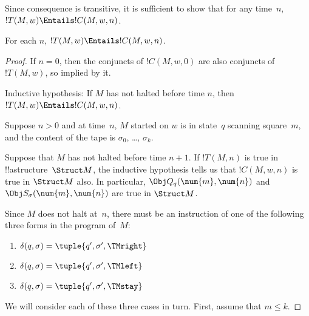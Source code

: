 \documentclass[../../../include/open-logic-section]{subfiles}
\begin{document}
Since consequence is transitive, it is sufficient to show that for any
time~$n$, $!T(M, w) \Entails !C(M, w, n)$.

\begin{lem} 
For each $n$, $!T(M, w) \Entails !C(M, w, n)$. 
\end{lem}

\begin{proof}
If $n = 0$, then the conjuncts of $!C(M, w, 0)$ are also conjuncts of
$!T(M, w)$, so implied by it.

Inductive hypothesis: If $M$ has not halted before time $n$, then
$!T(M,w) \Entails !C(M, w, n)$.

Suppose $n > 0$ and at time~$n$, $M$ started on $w$ is in state~$q$
scanning square~$m$, and the content of the tape is $\sigma_0$, \dots,
$\sigma_k$.

Suppose that $M$ has not halted before time $n+1$. If $!T(M,n)$ is
true in !!a{structure}~$\Struct M$, the inductive hypothesis tells us
that $!C(M, w, n)$ is true in $\Struct M$ also. In particular, $\Obj
Q_q(\num{m}, \num{n})$ and $\Obj S_\sigma(\num{m}, \num{n})$ are true
in $\Struct M$.

Since $M$ does not halt at~$n$, there must be an instruction of one of the
following three forms in the program of~$M$: 

\begin{enumerate} 
\item $\delta(q, \sigma) = \tuple{q', \sigma', \TMright}$

\item $\delta(q, \sigma) = \tuple{q', \sigma', \TMleft}$

\item $\delta(q, \sigma) = \tuple{q', \sigma', \TMstay}$
\end{enumerate}

We will consider each of these three cases in turn.  First, assume
that $m \le k$.


\end{proof}
\end{document}
